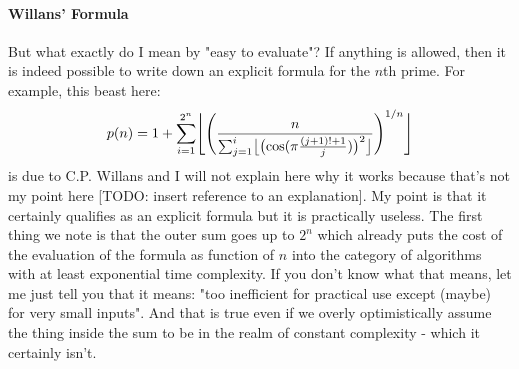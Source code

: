 \paragraph{Willans' Formula}
But what exactly do I mean by "easy to evaluate"? If anything is allowed, then it is indeed possible to write down an explicit formula for the $n$th prime. For example, this beast here:
\begin{equation}
 p(n) = 1 + \sum_{i = 1}^{2^n} 
 \floor[\Bigg]{
 \Biggl(
 \frac{n}{\sum_{j=1}^{i} \floor[\big]{ \bigl( \cos(\pi \frac{(j+1)!+1}{j}) \bigr)^2 } 
  }
 \Biggr)^{1/n}
 }
\end{equation}
is due to C.P. Willans and I will not explain here why it works because that's not my point here [TODO: insert reference to an explanation]. My point is that it certainly qualifies as an explicit formula but it is practically useless. The first thing we note is that the outer sum goes up to $2^n$ which already puts the cost of the evaluation of the formula as function of $n$ into the category of algorithms with at least exponential time complexity. If you don't know what that means, let me just tell you that it means: "too inefficient for practical use except (maybe) for very small inputs". And that is true even if we overly optimistically assume the thing inside the sum to be in the realm of constant complexity - which it certainly isn't. 





